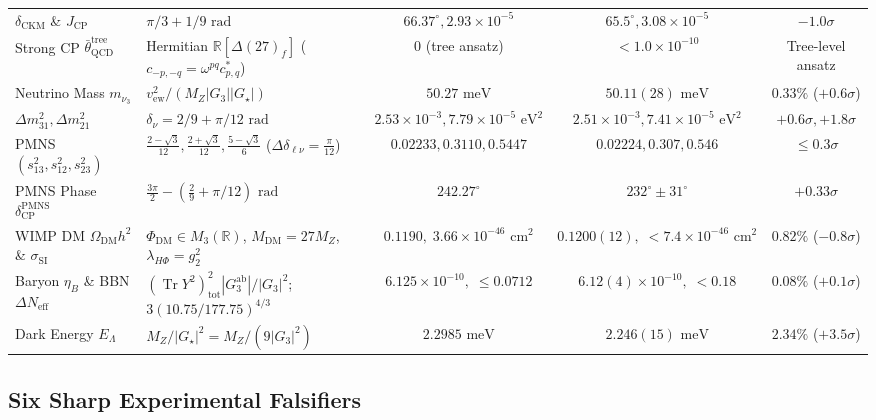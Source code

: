 \documentclass[11pt,a4paper]{article}
\theoremstyle{definition}
\theoremstyle{remark}
\newcommand{\R}{\mathbb{R}}
\newcommand{\Tr}{\operatorname{Tr}}
\newcommand{\Gthree}{G_3}
\newcommand{\Gstar}{G_\star}
\begin{document}
\begin{table}[!htbp]
{\begin{tabular}{@{}llccc@{}}
$\delta_{\mathrm{CKM}}$ \& $J_{\mathrm{CP}}$ & $\pi/3 + 1/9\text{ rad}$ & $66.37^\circ, 2.93\times 10^{-5}$ & $65.5^\circ, 3.08\times 10^{-5}$ & $-1.0\sigma$ \\
Strong CP $\bar{\theta}_{\mathrm{QCD}}^{\mathrm{tree}}$ & Hermitian $\R[\Delta(27)_f]$ ($c_{-p,-q}=\omega^{pq}c_{p,q}^*$) & $0$ (tree ansatz) & $< 1.0 \times 10^{-10}$ & Tree-level ansatz \\
Neutrino Mass $m_{\nu_3}$ & $v_{\mathrm{ew}}^2 / (M_Z |\Gthree| |\Gstar|)$ & $50.27\text{ meV}$ & $50.11(28)\text{ meV}$ & $0.33\%$ ($+0.6\sigma$) \\
$\Delta m_{31}^2, \Delta m_{21}^2$ & $\delta_\nu = 2/9 + \pi/12\text{ rad}$ & $2.53\times 10^{-3}, 7.79\times 10^{-5}\text{ eV}^2$ & $2.51\times 10^{-3}, 7.41\times 10^{-5}\text{ eV}^2$ & $+0.6\sigma, +1.8\sigma$ \\
PMNS $(s_{13}^2, s_{12}^2, s_{23}^2)$ & $\frac{2-\sqrt{3}}{12}, \frac{2+\sqrt{3}}{12}, \frac{5-\sqrt{3}}{6}$ ($\Delta\delta_{\ell\nu}=\frac{\pi}{12}$) & $0.02233, 0.3110, 0.5447$ & $0.02224, 0.307, 0.546$ & $\le 0.3\sigma$ \\
PMNS Phase $\delta_{\mathrm{CP}}^{\mathrm{PMNS}}$ & $\frac{3\pi}{2} - (\frac{2}{9} + \pi/12)\text{ rad}$ & $242.27^\circ$ & $232^\circ \pm 31^\circ$ & $+0.33\sigma$ \\
WIMP DM $\Omega_{\mathrm{DM}} h^2$ \& $\sigma_{\mathrm{SI}}$ & $\Phi_{\mathrm{DM}} \in M_3(\R)$, $M_{\mathrm{DM}} = 27 M_Z$, $\lambda_{H\Phi}=g_2^2$ & $0.1190,\; 3.66\times 10^{-46}\text{ cm}^2$ & $0.1200(12),\; <7.4\times 10^{-46}\text{ cm}^2$ & $0.82\%$ ($-0.8\sigma$) \\
Baryon $\eta_B$ \& BBN $\Delta N_{\mathrm{eff}}$ & $(\Tr Y^2)_{\mathrm{tot}}^2 |\Gthree^{\mathrm{ab}}| / |\Gthree|^2$;\; $3(10.75/177.75)^{4/3}$ & $6.125 \times 10^{-10},\; \le 0.0712$ & $6.12(4) \times 10^{-10},\; < 0.18$ & $0.08\%$ ($+0.1\sigma$) \\
Dark Energy $E_\Lambda$ & $M_Z / |\Gstar|^2 = M_Z / (9|\Gthree|^2)$ & $2.2985\text{ meV}$ & $2.246(15)\text{ meV}$ & $2.34\%$ ($+3.5\sigma$) \\
\bottomrule
\end{tabular}%
}
\end{table}

\subsection{Six Sharp Experimental Falsifiers}
\end{document}
